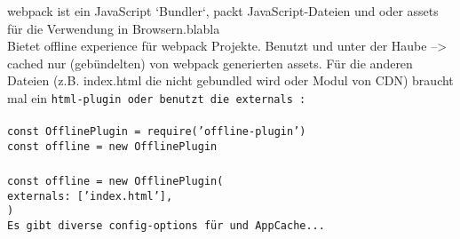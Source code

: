 webpack ist ein JavaScript `Bundler`, packt JavaScript-Dateien und oder assets für die Verwendung in Browsern.blabla\\
Bietet offline experience für webpack Projekte. Benutzt  und  unter der Haube --> cached nur (gebündelten) von webpack generierten assets. Für die anderen Dateien (z.B. index.html die nicht gebundled wird oder Modul von CDN) braucht mal ein \tt{html-plugin} oder benutzt die \tt{externals} :\\\\
\tt{const OfflinePlugin = require('offline-plugin')\\
  const offline = new OfflinePlugin\\\\
  const offline = new OfflinePlugin({\\
    externals: ['index.html'],\\
    })}\\
Es gibt diverse config-options für  und AppCache...~\cite{webpack-gh}
